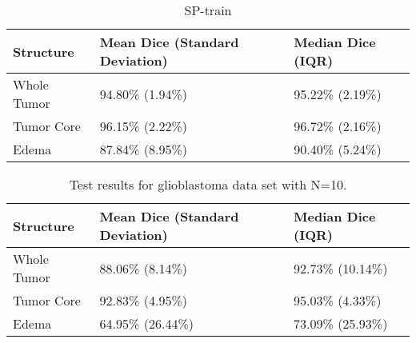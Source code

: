 \documentclass[11pt]{article}
\begin{document}
\begin{table}[H]
\centering
\begin{tabular}{@{}lll@{}}
\toprule
Structure & Mean Dice (Standard Deviation) & Median Dice (IQR) \\ \midrule
Whole Tumor & 94.80\% (1.94\%) & 95.22\% (2.19\%) \\
Tumor Core & 96.15\% (2.22\%) & 96.72\% (2.16\%) \\
Edema & 87.84\% (8.95\%) & 90.40\% (5.24\%) \\ \bottomrule
\end{tabular}
\caption{SP-train}
\label{Train results for glioblastoma data set with N=30.}
\end{table}
\begin{table}[H]
\centering
\begin{tabular}{@{}lll@{}}
\toprule
Structure & Mean Dice (Standard Deviation) & Median Dice (IQR) \\ \midrule
Whole Tumor & 88.06\% (8.14\%) & 92.73\% (10.14\%) \\
Tumor Core & 92.83\% (4.95\%) & 95.03\% (4.33\%) \\
Edema & 64.95\% (26.44\%) & 73.09\% (25.93\%) \\ \bottomrule
\end{tabular}
\caption{Test results for glioblastoma data set with N=10.}
\label{SP-test}
\end{table}
\end{document}
